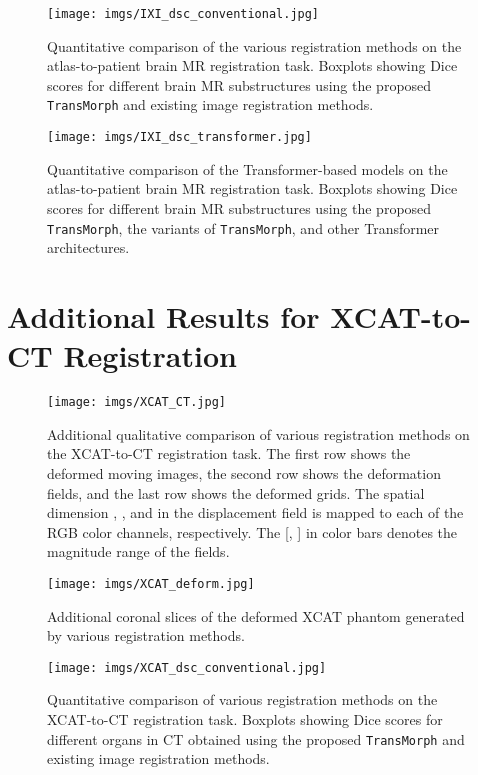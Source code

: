 \documentclass[times,twocolumn,final]{elsarticle}
\begin{document}
\newpage
\begin{figure*}[!htp]
\centering
\texttt{[image: imgs/IXI\_dsc\_conventional.jpg]}
\caption{Quantitative comparison of the various registration methods on the atlas-to-patient brain MR registration task. Boxplots showing Dice scores for different brain MR substructures using the proposed \texttt{TransMorph} and existing image registration methods. \label{fig:IXI_brain_conventional}}
\end{figure*}

\begin{figure*}[!htp]
\centering
\texttt{[image: imgs/IXI\_dsc\_transformer.jpg]}
\caption{Quantitative comparison of the Transformer-based models on the atlas-to-patient brain MR registration task. Boxplots showing Dice scores for different brain MR substructures using the proposed \texttt{TransMorph}, the variants of \texttt{TransMorph}, and other Transformer architectures.\label{fig:IXI_brain_transformer}}
\end{figure*}

\newpage
\section{Additional Results for XCAT-to-CT Registration}
\label{sec:add_xcat_ct}
\begin{figure*}[!htp]
\centering
\texttt{[image: imgs/XCAT\_CT.jpg]}
\caption{Additional qualitative comparison of various registration methods on the XCAT-to-CT registration task. The first row shows the deformed moving images, the second row shows the deformation fields, and the last row shows the deformed grids. The spatial dimension , , and  in the displacement field is mapped to each of the RGB color channels, respectively. The [, ] in color bars denotes the magnitude range of the fields.\label{fig:xcat_CT}}
\end{figure*}

\newpage
\begin{figure*}[!htp]
\centering
\texttt{[image: imgs/XCAT\_deform.jpg]}
\caption{Additional coronal slices of the deformed XCAT phantom generated by various registration methods. \label{fig:xcat_deform}}
\end{figure*}

\begin{figure*}[!htp]
\centering
\texttt{[image: imgs/XCAT\_dsc\_conventional.jpg]}
\caption{Quantitative comparison of various registration methods on the XCAT-to-CT registration task. Boxplots showing Dice scores for different organs in CT obtained using the proposed \texttt{TransMorph} and existing image registration methods.\label{fig:xcat_brain_conventional}}
\end{figure*}
\end{document}
